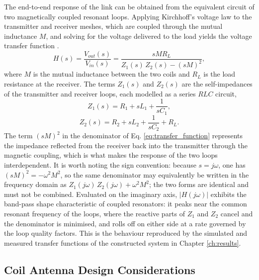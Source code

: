 The end-to-end response of the link can be obtained from the equivalent circuit
of two magnetically coupled resonant loops. Applying Kirchhoff's voltage law to
the transmitter and receiver meshes, which are coupled through the mutual
inductance $M$, and solving for the voltage delivered to the load yields the
voltage transfer function \cite{agbinya2022principles, yates2004}.
\begin{equation}
    H(s) = \frac{V_{out}(s)}{V_{in}(s)}
         = \frac{s M R_L}{Z_1(s)\,Z_2(s) - (sM)^2},
    \label{eq:transfer_function}
\end{equation}
where $M$ is the mutual inductance between the two coils and $R_L$ is the load
resistance at the receiver. The terms $Z_1(s)$ and $Z_2(s)$ are the
self-impedances of the transmitter and receiver loops, each modelled as a series
$RLC$ circuit,
\begin{equation}
    Z_1(s) = R_1 + sL_1 + \frac{1}{sC_1},
    \label{eq:z1}
\end{equation}
\begin{equation}
    Z_2(s) = R_2 + sL_2 + \frac{1}{sC_2} + R_L.
    \label{eq:z2}
\end{equation}
The term $(sM)^2$ in the denominator of Eq. \eqref{eq:transfer_function}
represents the impedance reflected from the receiver back into the transmitter
through the magnetic coupling, which is what makes the response of the two loops
interdependent. It is worth noting the sign convention: because $s = j\omega$, one
has $(sM)^2 = -\omega^2 M^2$, so the same denominator may equivalently be written
in the frequency domain as $Z_1(j\omega)\,Z_2(j\omega) + \omega^2 M^2$; the two
forms are identical and must not be combined.
\newp
Evaluated on the imaginary axis, $|H(j\omega)|$ exhibits the band-pass shape
characteristic of coupled resonators: it peaks near the common resonant frequency
of the loops, where the reactive parts of $Z_1$ and $Z_2$ cancel and the
denominator is minimised, and rolls off on either side at a rate governed by the
loop quality factors. This is the behaviour
reproduced by the simulated and measured transfer functions of the constructed
system in Chapter \ref{ch:results}.



\subsection{Coil Antenna Design Considerations}
\label{sec:coil_design}

